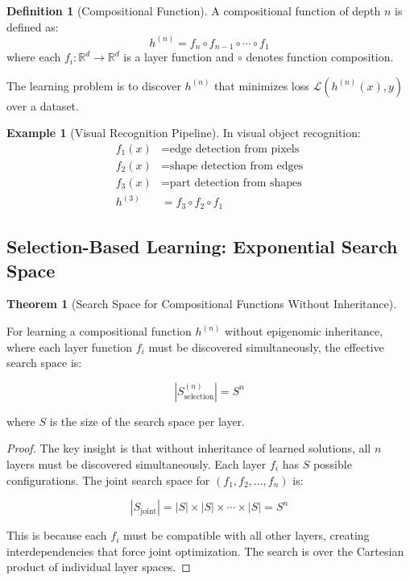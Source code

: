 \documentclass[11pt]{article}
\theoremstyle{definition}
\newtheorem{theorem}{Theorem}
\newtheorem{definition}{Definition}
\newtheorem{example}{Example}
\begin{document}
\begin{definition}[Compositional Function]
A compositional function of depth $n$ is defined as:
\begin{equation}
h^{(n)} = f_n \circ f_{n-1} \circ \cdots \circ f_1
\end{equation}
where each $f_i: \mathbb{R}^d \to \mathbb{R}^d$ is a layer function and $\circ$ denotes function composition.
\end{definition}

The learning problem is to discover $h^{(n)}$ that minimizes loss $\mathcal{L}(h^{(n)}(x), y)$ over a dataset.

\begin{example}[Visual Recognition Pipeline]
In visual object recognition:
\begin{align}
f_1(x) &= \text{edge detection from pixels} \\
f_2(x) &= \text{shape detection from edges} \\
f_3(x) &= \text{part detection from shapes} \\
h^{(3)} &= f_3 \circ f_2 \circ f_1
\end{align}
\end{example}

\subsection{Selection-Based Learning: Exponential Search Space}

\begin{theorem}[Search Space for Compositional Functions Without Inheritance]
\label{thm:selection-space}

For learning a compositional function $h^{(n)}$ without epigenomic inheritance, where each layer function $f_i$ must be discovered simultaneously, the effective search space is:

\begin{equation}
|S^{(n)}_{\text{selection}}| = S^n
\end{equation}

where $S$ is the size of the search space per layer.

\end{theorem}

\begin{proof}
The key insight is that without inheritance of learned solutions, all $n$ layers must be discovered simultaneously. Each layer $f_i$ has $S$ possible configurations. The joint search space for $(f_1, f_2, \ldots, f_n)$ is:

\begin{equation}
|S_{\text{joint}}| = |S| \times |S| \times \cdots \times |S| = S^n
\end{equation}

This is because each $f_i$ must be compatible with all other layers, creating interdependencies that force joint optimization. The search is over the Cartesian product of individual layer spaces.
\end{proof}
\end{document}
